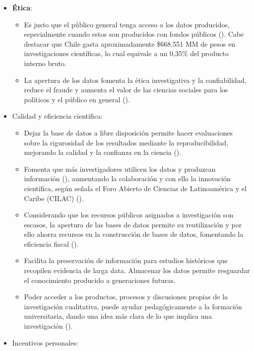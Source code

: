 \documentclass[
  spanish,
  a4paper,
  oneside]{scrbook}
\begin{document}
\begin{itemize}
\item
  \textbf{Ética}:

  \begin{itemize}
  \item
    Es justo que el público general tenga acceso a los datos producidos,
    especialmente cuando estos son producidos con fondos públicos
    (). Cabe destacar que
    Chile gasta aproximadamente \$668.551 MM de pesos en investigaciones
    científicas, lo cual equivale a un 0,35\% del producto interno
    bruto.
  \item
    La apertura de los datos fomenta la ética investigativa y la
    confiabilidad, reduce el fraude y aumenta el valor de las ciencias
    sociales para los políticos y el público en general
    ().
  \end{itemize}
\item
  Calidad y eficiencia científica:

  \begin{itemize}
  \item
    Dejar la base de datos a libre disposición permite hacer
    evaluaciones sobre la rigurosidad de los resultados mediante la
    reproducibilidad, mejorando la calidad y la confianza en la ciencia
    ().
  \item
    Fomenta que más investigadores utilicen los datos y produzcan
    información (),
    aumentando la colaboración y con ello la innovación científica,
    según señala el Foro Abierto de Ciencias de Latinoamérica y el
    Caribe (CILAC) ().
  \item
    Considerando que los recursos públicos asignados a investigación son
    escasos, la apertura de las bases de datos permite su reutilización
    y por ello ahorra recursos en la construcción de bases de datos,
    fomentando la eficiencia fiscal
    ().
  \item
    Facilita la preservación de información para estudios históricos que
    recopilen evidencia de larga data. Almacenar los datos permite
    resguardar el conocimiento producido a generaciones futuras.
  \item
    Poder acceder a los productos, procesos y discusiones propias de la
    investigación cualitativa, puede ayudar pedagógicamente a la
    formación universitaria, dando una idea más clara de lo que implica
    una investigación ().
  \end{itemize}
\item
  Incentivos personales:


\end{itemize}
\end{document}

